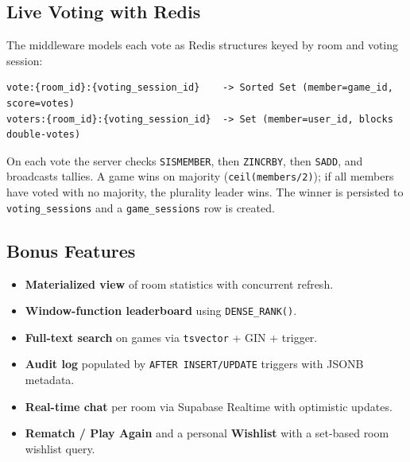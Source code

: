 \documentclass[11pt,a4paper]{article}
\begin{document}
\subsection{Live Voting with Redis}
The middleware models each vote as Redis structures keyed by room and voting
session:
\begin{lstlisting}
vote:{room_id}:{voting_session_id}    -> Sorted Set (member=game_id, score=votes)
voters:{room_id}:{voting_session_id}  -> Set (member=user_id, blocks double-votes)
\end{lstlisting}
On each vote the server checks \texttt{SISMEMBER}, then \texttt{ZINCRBY}, then
\texttt{SADD}, and broadcasts tallies. A game wins on majority
(\texttt{ceil(members/2)}); if all members have voted with no majority, the
plurality leader wins. The winner is persisted to \texttt{voting\_sessions} and a
\texttt{game\_sessions} row is created.

\subsection{Bonus Features}
\begin{itemize}[leftmargin=1.4em]
  \item \textbf{Materialized view} of room statistics with concurrent refresh.
  \item \textbf{Window-function leaderboard} using \texttt{DENSE\_RANK()}.
  \item \textbf{Full-text search} on games via \texttt{tsvector} + GIN + trigger.
  \item \textbf{Audit log} populated by \texttt{AFTER INSERT/UPDATE} triggers with JSONB metadata.
  \item \textbf{Real-time chat} per room via Supabase Realtime with optimistic updates.
  \item \textbf{Rematch / Play Again} and a personal \textbf{Wishlist} with a set-based room wishlist query.
\end{itemize}

\end{document}
